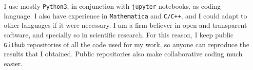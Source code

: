 \documentclass[combined.tex]{subfiles}
\begin{document}
I use mostly \texttt{Python3}, in conjunction with \texttt{jupyter} notebooks, as coding language. I also have experience in \texttt{Mathematica} and \texttt{C/C++}, and I could adapt to other languages if it were necessary. I am a firm believer in open and transparent software, and specially so in scientific research. For this reason, I keep public \texttt{Github} repositories of all the code used for my work, so anyone can reproduce the results that I obtained. Public repositories also make collaborative coding much easier.

\printbibliography[heading=bibintoc]
\end{document}
